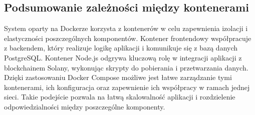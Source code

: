 \subsection{Podsumowanie zależności między kontenerami}

System oparty na Dockerze korzysta z kontenerów w celu zapewnienia izolacji i elastyczności poszczególnych komponentów. Kontener frontendowy współpracuje z backendem, który realizuje logikę aplikacji i komunikuje się z bazą danych PostgreSQL. Kontener Node.js odgrywa kluczową rolę w integracji aplikacji z blockchainem Solany, wykonując skrypty do pobierania i przetwarzania danych. Dzięki zastosowaniu Docker Compose możliwe jest łatwe zarządzanie tymi kontenerami, ich konfiguracja oraz zapewnienie ich współpracy w ramach jednej sieci. Takie podejście pozwala na łatwą skalowalność aplikacji i rozdzielenie odpowiedzialności między poszczególne komponenty.